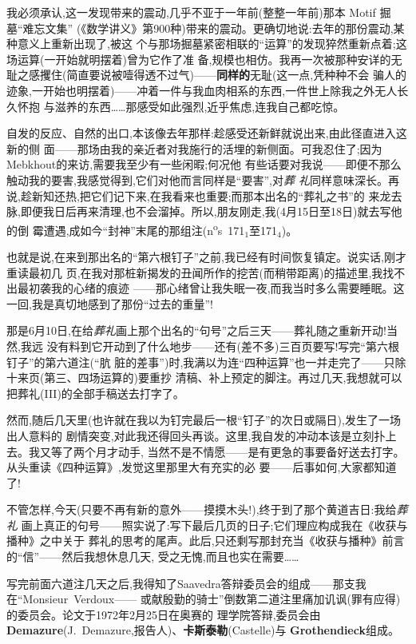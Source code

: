 我必须承认,这一发现带来的震动,几乎不亚于一年前(整整一年前)那本 Motif 掘墓“难忘文集”
(《数学讲义》第900种)带来的震动。更确切地说:去年的那份震动,某种意义上重新出现了,被这
个与那场掘墓紧密相联的“运算”的发现猝然重新点着;这场运算(一开始就明摆着)曾为它作了准
备,规模也相仿。我再一次被那种安详的无耻之感攫住(简直要说被噎得透不过气)——\textbf{同样的}无耻(这一点,凭种种不会
骗人的迹象,一开始也明摆着)——冲着一件与我血肉相系的东西,一件世上除我之外无人长久怀抱
与滋养的东西……那感受如此强烈,近乎焦虑,连我自己都吃惊。

\pmark{}自发的反应、自然的出口,本该像去年那样:趁感受还新鲜就说出来,由此径直进入这新的侧
面——那场由我的亲近者对我施行的活埋的新侧面。可我忍住了;因为Mebkhout的来访,需要我至少有一些闲暇;何况他
有些话要对我说——即便不那么触动我的要害,我感觉得到,它们对他而言同样是“要害”,对\emph{葬
礼}同样意味深长。再说,趁新知还热,把它们记下来,在我看来也重要;而那本出名的“葬礼之书”的
来龙去脉,即便我日后再来清理,也不会溜掉。所以,朋友刚走,我(4月15日至18日)就去写他的倒
霉遭遇,成如今“封神”末尾的那组注(n\textsuperscript{o}s~171$_{1}$至171$_{4}$)。

也就是说,在来到那出名的“第六根钉子”之前,我已经有时间恢复镇定。说实话,刚才重读最初几
页,在我对那桩新揭发的丑闻所作的挖苦(而稍带距离)的描述里,我找不出最初袭我的心绪的痕迹
——那心绪曾让我失眠一夜,而我当时多么需要睡眠。这一回,我是真切地感到了那份“过去的重量”!

那是6月10日,在给\emph{葬礼}画上那个出名的“句号”之后三天——葬礼随之重新开动!当然,我远
没有料到它开动到了什么地步——还有(差不多)三百页要写!写完“第六根钉子”的第六道注(“肮
脏的差事”)时,我满以为连“四种运算”也一并走完了——只除十来页(第三、四场运算的)要重抄
清稿、补上预定的脚注。再过几天,我想就可以把葬礼(III)的全部手稿送去打字了。

然而,随后几天里(也许就在我以为钉完最后一根“钉子”的次日或隔日),发生了一场出人意料的
剧情突变,对此我还得回头再谈。这里,我自发的冲动本该是立刻扑上去。我又等了两个月才动手,
当然不是不情愿\dmark{}——是有更急的事要备好送去打字。从头重读《四种运算》,发觉这里那里大有充实的必
要——后事如何,大家都知道了!

不管怎样,今天(只要不再有新的意外——摸摸木头!),终于到了那个黄道吉日:我给\emph{葬礼}
画上真正的句号——照实说了:写下最后几页的日子;它们理应构成我在《收获与播种》之中关于
葬礼的思考的尾声。此后,只还剩写那封充当《收获与播种》前言的“信”——然后我想休息几天,
受之无愧,而且也实在需要……

写完前面六道注几天之后,我得知了Saavedra答辩委员会的组成——那支我在“Monsieur~Verdoux——
或献殷勤的骑士”倒数第二道注里痛加讥讽(罪有应得)的委员会。论文于1972年2月25日在奥赛的
理学院答辩,委员会由\textbf{Demazure}(J.~Demazure,报告人)、\textbf{卡斯泰勒}(Castelle)与
\textbf{Grothendieck}组成。

